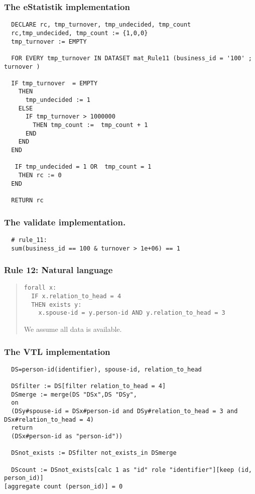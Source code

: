 \subsubsection*{The eStatistik implementation}
\begin{verbatim}
  DECLARE rc, tmp_turnover, tmp_undecided, tmp_count
  rc,tmp_undecided, tmp_count := {1,0,0}
  tmp_turnover := EMPTY

  FOR EVERY tmp_turnover IN DATASET mat_Rule11 (business_id = '100' ; turnover )

  IF tmp_turnover  = EMPTY 
    THEN
      tmp_undecided := 1 
    ELSE
      IF tmp_turnover > 1000000
        THEN tmp_count :=  tmp_count + 1  
      END
    END
  END

   IF tmp_undecided = 1 OR  tmp_count = 1
    THEN rc := 0
  END
 
  RETURN rc
\end{verbatim}
\subsubsection*{The validate implementation.}
\begin{verbatim}
  # rule_11:
  sum(business_id == 100 & turnover > 1e+06) == 1
\end{verbatim}


\newpage

\subsubsection*{  Rule 12: Natural language}
\begin{quote}


\begin{verbatim}
forall x: 
  IF x.relation_to_head = 4 
  THEN exists y:
    x.spouse-id = y.person-id AND y.relation_to_head = 3
\end{verbatim}

We assume all data is available.


\end{quote}
\subsubsection*{The VTL implementation}
\begin{verbatim}
  DS=person-id(identifier), spouse-id, relation_to_head

  DSfilter := DS[filter relation_to_head = 4]
  DSmerge := merge(DS "DSx",DS "DSy",
  on
  (DSy#spouse-id = DSx#person-id and DSy#relation_to_head = 3 and
DSx#relation_to_head = 4)
  return
  (DSx#person-id as "person-id"))

  DSnot_exists := DSfilter not_exists_in DSmerge

  DScount := DSnot_exists[calc 1 as "id" role "identifier"][keep (id, person_id)]
[aggregate count (person_id)] = 0
\end{verbatim}
